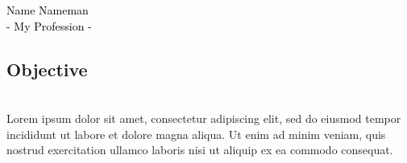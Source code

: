 \documentclass{resume_template}
\begin{document}
\begin{tcbraster}[raster columns=6,raster height=11in,raster width=8.5in,raster column skip=0in,raster row skip=0in,raster force size=false]
	\begin{tcolorbox}[header, raster multicolumn=2]
		\begin{center}	
		\end{center}
	\end{tcolorbox}
	\begin{tcolorbox}[header,raster multicolumn=4]
		\vspace*{\fill}
		\begin{center}	
			\Huge{\textcolor{black}{Name Nameman}}\\	
			\Large{\textcolor{black}{- My Profession -}}	
		\end{center}
		\vspace*{\fill}
	\end{tcolorbox}

	\begin{tcolorbox}[sidebar,raster multicolumn=2]
		\section*{Objective}
			\vspace*{-0.2in}
			\hrulefill\\
			Lorem ipsum dolor sit amet, consectetur adipiscing elit, sed do eiusmod tempor incididunt ut labore et dolore magna aliqua. Ut enim ad minim veniam, quis nostrud exercitation ullamco laboris nisi ut aliquip ex ea commodo consequat.
			 		

\end{tcolorbox}
\end{tcbraster}
\end{document}
